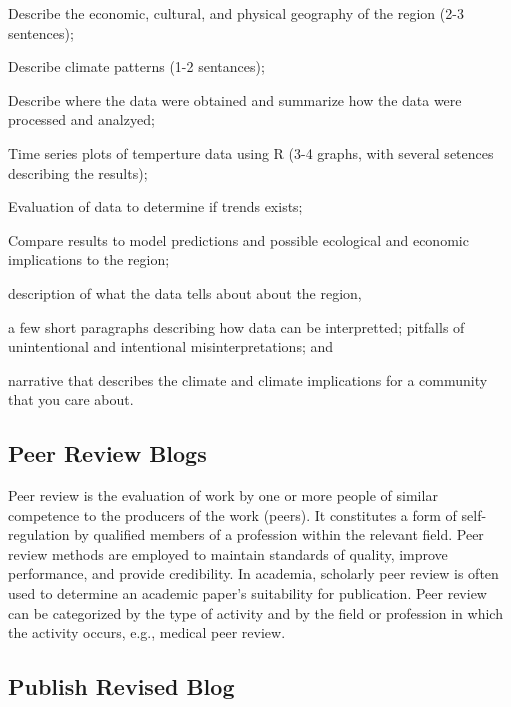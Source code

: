 \documentclass{article}\usepackage[]{graphicx}\usepackage[]{color}
\newenvironment{itemize*}%
  {\begin{itemize}%
    \setlength{\itemsep}{0pt}%
    \setlength{\parskip}{0pt}}%
  {\end{itemize}}
\begin{document}
\begin{itemize*}
  \item Describe the economic, cultural, and physical geography of the region (2-3 sentences);
  \item Describe climate patterns (1-2 sentances);
  \item Describe where the data were obtained and summarize how the data were processed and analzyed;
  \item Time series plots of temperture data using R (3-4 graphs, with several setences describing the results);
  \item Evaluation of data to determine if trends exists;
  \item Compare results to model predictions and possible ecological and economic implications to the region; 
    \item description of what the data tells about about the region, 
  \item a few short paragraphs describing how data can be interpretted; pitfalls of unintentional and intentional misinterpretations; and 
  \item narrative that describes the climate and climate implications for a community that you care about.
\end{itemize*}

\subsection{Peer Review Blogs}

Peer review is the evaluation of work by one or more people of similar competence to the producers of the work (peers). It constitutes a form of self-regulation by qualified members of a profession within the relevant field. Peer review methods are employed to maintain standards of quality, improve performance, and provide credibility. In academia, scholarly peer review is often used to determine an academic paper's suitability for publication. Peer review can be categorized by the type of activity and by the field or profession in which the activity occurs, e.g., medical peer review.

\subsection{Publish Revised Blog}
\end{document}
